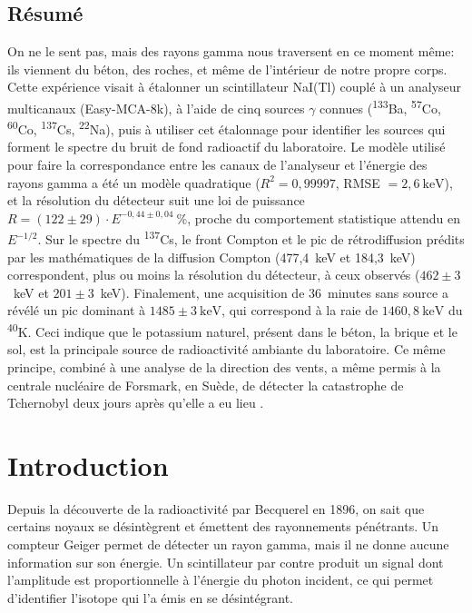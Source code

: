 \documentclass[11pt,letterpaper]{article}
\begin{document}
\subsection*{Résumé}
On ne le sent pas, mais des rayons gamma nous traversent en ce moment même: ils viennent du béton, des roches, et même de l'intérieur de notre propre corps. Cette expérience visait à étalonner un scintillateur NaI(Tl) couplé à un analyseur multicanaux (Easy-MCA-8k), à l'aide de cinq sources $\gamma$ connues (\textsuperscript{133}Ba, \textsuperscript{57}Co, \textsuperscript{60}Co, \textsuperscript{137}Cs, \textsuperscript{22}Na), puis à utiliser cet étalonnage pour identifier les sources qui forment le spectre du bruit de fond radioactif du laboratoire. Le modèle utilisé pour faire la correspondance entre les canaux de l'analyseur et l'énergie des rayons gamma a été un modèle quadratique ($R^2 = 0{,}99997$, RMSE $= 2{,}6~\text{keV}$), et la résolution du détecteur suit une loi de puissance $R = (122 \pm 29)\cdot E^{-0{,}44 \pm 0{,}04}~\%$, proche du comportement statistique attendu en $E^{-1/2}$. Sur le spectre du \textsuperscript{137}Cs, le front Compton et le pic de rétrodiffusion prédits par les mathématiques de la diffusion Compton (477,4~keV et 184,3~keV) correspondent, plus ou moins la résolution du détecteur, à ceux observés ($462 \pm 3$~keV et $201 \pm 3$~keV). Finalement, une acquisition de 36~minutes sans source a révélé un pic dominant à $1485 \pm 3~\text{keV}$, qui correspond à la raie de $1460{,}8~\text{keV}$ du \textsuperscript{40}K. Ceci indique que le potassium naturel, présent dans le béton, la brique et le sol, est la principale source de radioactivité ambiante du laboratoire. Ce même principe, combiné à une analyse de la direction des vents, a même permis à la centrale nucléaire de Forsmark, en Suède, de détecter la catastrophe de Tchernobyl deux jours après qu'elle a eu lieu \cite{forsmark}.

\section{Introduction}

Depuis la découverte de la radioactivité par Becquerel en 1896, on sait que certains noyaux se désintègrent et émettent des rayonnements pénétrants. Un compteur Geiger permet de détecter un rayon gamma, mais il ne donne aucune information sur son énergie. Un scintillateur par contre produit un signal dont l'amplitude est proportionnelle à l'énergie du photon incident, ce qui permet d'identifier l'isotope qui l'a émis en se désintégrant.
\end{document}
